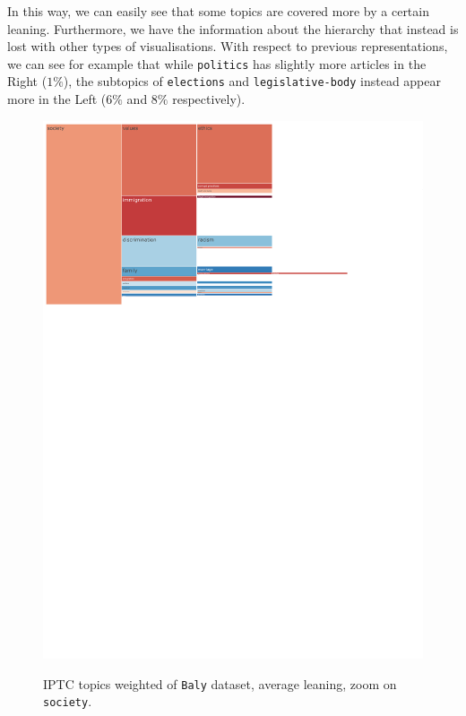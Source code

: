 In this way, we can easily see that some topics are covered more by a certain leaning. Furthermore, we have the information about the hierarchy that instead is lost with other types of visualisations.
%
With respect to previous representations, we can see for example that while \texttt{politics} has slightly more articles in the Right ($1\%$), the subtopics of \texttt{elections} and \texttt{legislative-body} instead appear more in the Left ($6\%$ and $8\%$ respectively).


\begin{figure}[!htbp]
    \centering
    \href{https://martinomensio.github.io/phd-project/figures/baly_iptc_weighted_by_leaning.html}{\includegraphics[trim={0.15cm 19.5cm 5cm 0.15cm},clip,width=\linewidth]{figures/baly_iptc_weighted_by_leaning_zoom_society.pdf}}
    \caption{IPTC topics weighted of \texttt{Baly} dataset, average leaning, zoom on \texttt{society}.}
    \label{fig:baly_iptc_weighted_by_leaning_zoom_society}
\end{figure}


